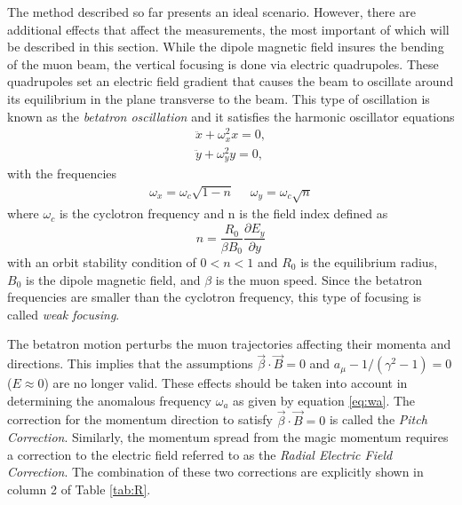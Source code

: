 \documentclass{outhesis}
\begin{document}
The method described so far presents an ideal scenario. However, there are additional effects that affect the measurements, the most important of which will be described in this section.  
While the dipole magnetic field insures the bending of the muon beam, the vertical focusing is done via electric quadrupoles. These quadrupoles set an electric field gradient that causes the beam to oscillate around its equilibrium in the plane transverse to the beam. This type of oscillation is known as the \emph{betatron oscillation} and it satisfies the harmonic oscillator equations 
\begin{equation}
\begin{split}
\ddot{x} + \omega_x^2 x = 0, \\
\ddot{y} + \omega_y^2 y = 0,
\end{split}
\end{equation}
with the frequencies 
\begin{equation}
\begin{split}
\omega_x = \omega_c\sqrt{1-n} \,\,\,\,\,\,\,\,
\omega_y = \omega_c\sqrt{n}
\end{split}
\end{equation}
where $ \omega_c$ is the cyclotron frequency and n is the field index defined as 
\begin{equation}
n = \frac{R_0}{\beta B_0}\frac{\partial E_y}{\partial y}
\end{equation}
with an orbit stability condition of $0<n<1$ and $R_0$ is the equilibrium radius, $B_0$ is the dipole magnetic field, and $\beta$ is the muon speed. Since the betatron frequencies are smaller than the cyclotron frequency, this type of focusing is called \emph{weak focusing}.
 
The betatron motion perturbs the muon trajectories affecting their momenta and directions. This implies that the assumptions $\overrightarrow{\beta} \cdot \overrightarrow{B} = 0$ and $a_{\mu} -1/\left(\gamma^2-1\right) = 0$ ($E \approx 0$) are no longer valid. These effects should be taken into account in determining the anomalous frequency $\omega_a$ as given by equation \ref{eq:wa}. The correction for the momentum direction to satisfy $\overrightarrow{\beta} \cdot \overrightarrow{B} = 0$ is called the \emph{Pitch Correction}. Similarly, the momentum spread from the magic momentum requires a correction to the electric field referred to as the \emph{Radial Electric Field Correction}. The combination of these two corrections are explicitly shown in column 2 of Table \ref{tab:R}. 
\end{document}
